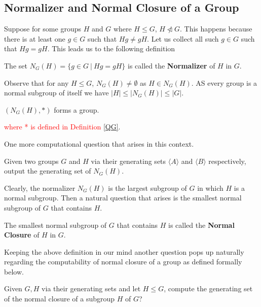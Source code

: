 \subsection{Normalizer and Normal Closure of a Group}
Suppose for some groups $H$ and $G$ where $H\leq G$, $H\ntriangleleft G$. This happens because there is at least one $g\in G$ such that $Hg\neq gH$. 
Let us collect all such $g\in G$ such that $Hg = gH$. This leads us to the following definition 
\begin{definition}\label{normalizer}
	The set $N_G(H) = \{g\in G~|~Hg = gH\}$ is called the {\bf Normalizer} of $H$ in $G$.
\end{definition}
Observe that for any $H\leq G$, $N_G(H) \neq \emptyset$ as $H\in N_G(H)$. AS every group is a normal subgroup of itself we have $|H|\leq |N_G(H)| \leq |G|$.

\begin{observation}
 $(N_G(H),*)$ forms a group. 
\end{observation}
 
 \textcolor{red}{
where * is defined in Definition \ref{QG}}. 
 
 One more computational question that arises in this context.
\begin{problem}\label{3}
	Given two groups $G$ and $H$ via their generating sets $\langle A\rangle$ and $\langle B\rangle$ respectively, output the generating set of $N_G(H)$.
\end{problem}
Clearly, the normalizer $N_G(H)$ is the largest subgroup of $G$ in which $H$ is a normal subgroup. Then a natural question that arises is the smallest normal subgroup of $G$ that contains $H$. 
\begin{definition}
The smallest normal subgroup of $G$ that contains $H$ is called the {\bf Normal Closure} of $H$ in $G$.
\end{definition}
Keeping the above definition in our mind another question pops up naturally regarding the computability of normal closure of a group as defined formally below.
\begin{exercise}
	Given $G,H$ via their generating sets and let $H\leq G$, compute the generating set of the normal closure of a subgroup $H$ of $G$? 
\end{exercise}


